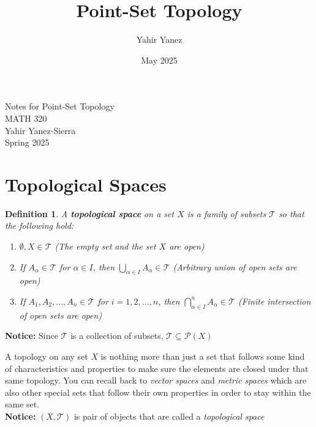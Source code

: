 \documentclass{article}
\title{Point-Set Topology}
\author{Yahir Yanez}
\date{May 2025}
\newtheorem*{definition*}{Definition}
\begin{document}
\begin{center}
    \vspace*{\fill}
    \Huge Notes for Point-Set Topology \\
    \Huge MATH 320 \\
    \vspace{10mm}
    \LARGE Yahir Yanez-Sierra \\
    \vspace{2mm}
    \LARGE Spring 2025
    \vspace*{\fill}
\end{center}
\newpage

\section*{Topological Spaces}
\begin{tcolorbox}[colback=definition!65]
    \begin{definition*}
        A \textbf{topological space} on a set $X$ is a family of subsets $\mathcal{T}$ so that the following hold:
        \begin{enumerate}
            \item[(i)] $\emptyset, X \in \mathcal{T}$ (The empty set and the set $X$ are open)
            \item[(ii)] If $A_\alpha \in \mathcal{T}$ for $\alpha \in I$, then $\bigcup_{\alpha \in I} A_\alpha \in \mathcal{T}$ (Arbitrary union of open sets are open)
            \item[(iii)] If $A_1, A_2, ..., A_n \in \mathcal{T}$ for $i = 1, 2, ..., n$, then $\bigcap^{n}_{\alpha \in I} A_\alpha \in \mathcal{T}$ (Finite intersection of open sets are open)
        \end{enumerate}
    \end{definition*}
    \textbf{Notice:} Since $\mathcal{T}$ is a collection of subsets, $\mathcal{T} \subseteq \mathcal{P}(X)$
\end{tcolorbox}

A topology on any set $X$ is nothing more than just a set that follows some kind of characteristics and properties to make sure the elements are closed under that same topology. You can recall back to \textit{vector spaces} and \textit{metric spaces} which are also other special sets that follow their own properties in order to stay within the same set. \\

\textbf{Notice:} $(X, \mathcal{T})$ is pair of objects that are called a \textit{topological space}
\end{document}
